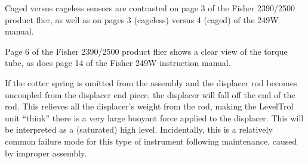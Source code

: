 












Caged versus cageless sensors are contrasted on page 3 of the Fisher 2390/2500 product flier, as well as on pages 3 (cageless) versus 4 (caged) of the 249W manual.

\vskip 10pt

Page 6 of the Fisher 2390/2500 product flier shows a clear view of the torque tube, as does page 14 of the Fisher 249W instruction manual.

\vskip 10pt

If the cotter spring is omitted from the assembly and the displacer rod becomes uncoupled from the displacer end piece, the displacer will fall off the end of the rod.  This relieves all the displacer's weight from the rod, making the LevelTrol unit ``think'' there is a very large buoyant force applied to the displacer.  This will be interpreted as a (saturated) high level.  Incidentally, this is a relatively common failure mode for this type of instrument following maintenance, caused by improper assembly.




